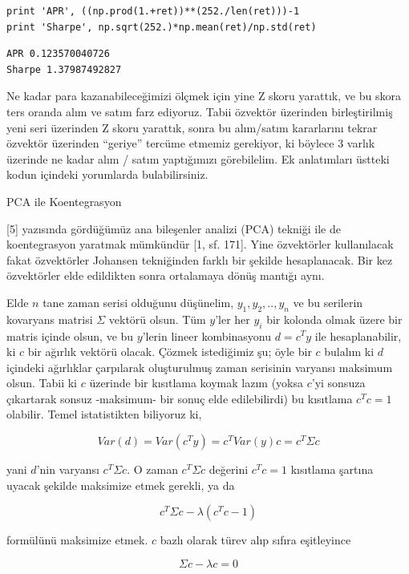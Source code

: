 \documentclass[12pt,fleqn]{article}\usepackage{../../common}
\begin{document}
\begin{verbatim}
print 'APR', ((np.prod(1.+ret))**(252./len(ret)))-1
print 'Sharpe', np.sqrt(252.)*np.mean(ret)/np.std(ret)
\end{verbatim}

\begin{verbatim}
APR 0.123570040726
Sharpe 1.37987492827
\end{verbatim}

Ne kadar para kazanabileceğimizi ölçmek için yine Z skoru yarattık, ve bu
skora ters oranda alım ve satım farz ediyoruz. Tabii özvektör üzerinden
birleştirilmiş yeni seri üzerinden Z skoru yarattık, sonra bu alım/satım
kararlarını tekrar özvektör üzerinden ``geriye'' tercüme etmemiz gerekiyor,
ki böylece 3 varlık üzerinde ne kadar alım / satım yaptığımızı
görebilelim. Ek anlatımları üstteki kodun içindeki yorumlarda
bulabilirsiniz.


PCA ile Koentegrasyon

[5] yazısında gördüğümüz ana bileşenler analizi (PCA) tekniği ile de
koentegrasyon yaratmak mümkündür [1, sf. 171]. Yine özvektörler kullanılacak
fakat özvektörler Johansen tekniğinden farklı bir şekilde hesaplanacak. Bir kez
özvektörler elde edildikten sonra ortalamaya dönüş mantığı aynı.

Elde $n$ tane zaman serisi olduğunu düşünelim, $y_1,y_2,..,y_n$ ve bu serilerin
kovaryans matrisi $\Sigma$ vektörü olsun. Tüm $y$'ler her $y_i$ bir kolonda
olmak üzere bir matris içinde olsun, ve bu $y$'lerin lineer kombinasyonu $d =
c^T y$ ile hesaplanabilir, ki $c$ bir ağırlık vektörü olacak. Çözmek istediğimiz
şu; öyle bir $c$ bulalım ki $d$ içindeki ağırlıklar çarpılarak oluşturulmuş
zaman serisinin varyansı maksimum olsun. Tabii ki $c$ üzerinde bir kısıtlama
koymak lazım (yoksa $c$'yi sonsuza çıkartarak sonsuz -maksimum- bir sonuç elde
edilebilirdi) bu kısıtlama $c^T c = 1$ olabilir. Temel istatistikten biliyoruz
ki,

$$
Var(d) = Var(c^T y) = c^T Var(y) c = c^T \Sigma c 
$$

yani $d$'nin varyansı $c^T \Sigma c$. O zaman $c^T \Sigma c$ değerini $c^Tc=1$
kısıtlama şartına uyacak şekilde maksimize etmek gerekli, ya da

$$
c^T \Sigma c - \lambda (c^Tc - 1)
$$

formülünü maksimize etmek. $c$ bazlı olarak türev alıp sıfıra eşitleyince

$$
\Sigma c - \lambda c = 0
$$
\end{document}
